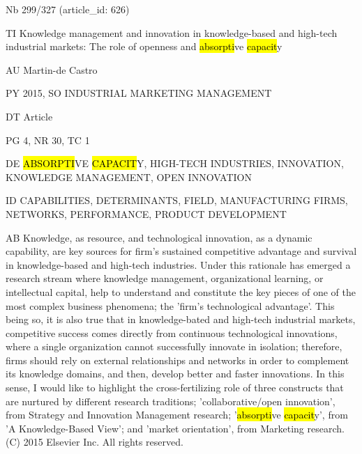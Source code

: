 \documentclass[a4paper]{article}
\begin{document}
\vspace*{-2cm}
Nb \tabto{0cm}299/327 (article\_id: 626)\par
TI \tabto{0cm}Knowledge management and innovation in knowledge-based and high-tech industrial markets: The role of openness and \hl{absorpti}ve \hl{capacit}y\par
AU \tabto{0cm}Martin-de Castro\par
PY \tabto{0cm}2015, SO INDUSTRIAL MARKETING MANAGEMENT\par
DT \tabto{0cm}Article\par
PG \tabto{0cm}4, NR 30, TC 1\par
DE \tabto{0cm}\hl{ABSORPTI}VE \hl{CAPACIT}Y, HIGH-TECH INDUSTRIES, INNOVATION, KNOWLEDGE MANAGEMENT, OPEN INNOVATION\par
ID \tabto{0cm}CAPABILITIES, DETERMINANTS, FIELD, MANUFACTURING FIRMS, NETWORKS, PERFORMANCE, PRODUCT DEVELOPMENT\par
AB \tabto{0cm}Knowledge, as resource, and technological innovation, as a dynamic capability, are key sources for firm's sustained competitive advantage and survival in knowledge-based and high-tech industries. Under this rationale has emerged a research stream where knowledge management, organizational learning, or intellectual capital, help to understand and constitute the key pieces of one of the most complex business phenomena; the 'firm's technological advantage'. This being so, it is also true that in knowledge-bated and high-tech industrial markets, competitive success comes directly from continuous technological innovations, where a single organization cannot successfully innovate in isolation; therefore, firms should rely on external relationships and networks in order to complement its knowledge domains, and then, develop better and faster innovations. In this sense, I would like to highlight the cross-fertilizing role of three constructs that are nurtured by different research traditions; 'collaborative/open innovation', from Strategy and Innovation Management research; '\hl{absorpti}ve \hl{capacit}y', from 'A Knowledge-Based View'; and 'market orientation', from Marketing research. (C) 2015 Elsevier Inc. All rights reserved.\par
\clearpage
\end{document}

